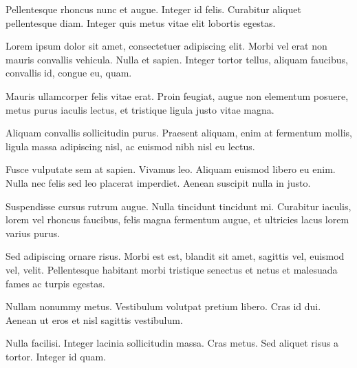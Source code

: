 Pellentesque rhoncus nunc et augue. Integer id felis. Curabitur aliquet pellentesque diam. Integer quis metus vitae elit lobortis egestas.

Lorem ipsum dolor sit amet, consectetuer adipiscing elit. Morbi vel erat non mauris convallis vehicula. Nulla et sapien. Integer tortor tellus, aliquam faucibus, convallis id, congue eu, quam.

Mauris ullamcorper felis vitae erat. Proin feugiat, augue non elementum posuere, metus purus iaculis lectus, et tristique ligula justo vitae magna.

Aliquam convallis sollicitudin purus. Praesent aliquam, enim at fermentum mollis, ligula massa adipiscing nisl, ac euismod nibh nisl eu lectus.

Fusce vulputate sem at sapien. Vivamus leo. Aliquam euismod libero eu enim. Nulla nec felis sed leo placerat imperdiet. Aenean suscipit nulla in justo.

Suspendisse cursus rutrum augue. Nulla tincidunt tincidunt mi. Curabitur iaculis, lorem vel rhoncus faucibus, felis magna fermentum augue, et ultricies lacus lorem varius purus.

Sed adipiscing ornare risus. Morbi est est, blandit sit amet, sagittis vel, euismod vel, velit. Pellentesque habitant morbi tristique senectus et netus et malesuada fames ac turpis egestas.

Nullam nonummy metus. Vestibulum volutpat pretium libero. Cras id dui. Aenean ut eros et nisl sagittis vestibulum.

Nulla facilisi. Integer lacinia sollicitudin massa. Cras metus. Sed aliquet risus a tortor. Integer id quam.
